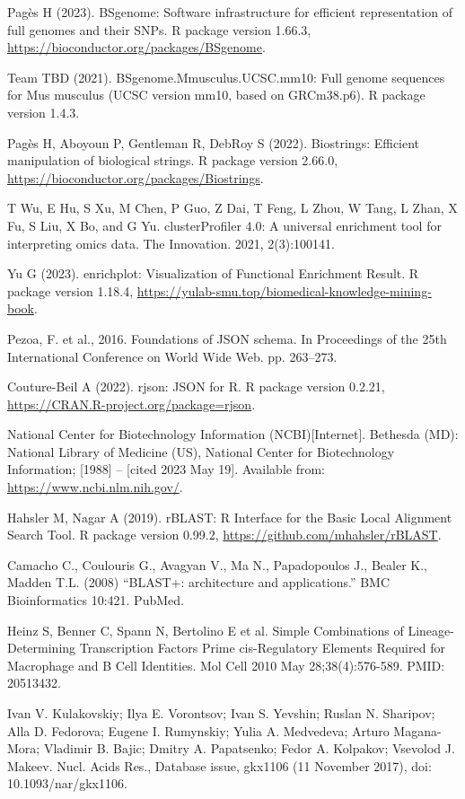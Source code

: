 \documentclass[12pt]{article}
\begin{document}
\begin{thebibliography}{99}
 Pagès H (2023). BSgenome: Software infrastructure for
efficient representation of full genomes and their SNPs. R package version
1.66.3, \newline
\url{https://bioconductor.org/packages/BSgenome}.

 Team TBD (2021). BSgenome.Mmusculus.UCSC.mm10: Full
genome sequences for Mus musculus (UCSC version mm10, based on GRCm38.p6). R
package version 1.4.3.

 Pagès H, Aboyoun P, Gentleman R, DebRoy S (2022).
Biostrings: Efficient manipulation of biological strings. R package version
2.66.0, \newline
\url{https://bioconductor.org/packages/Biostrings}.

 T Wu, E Hu, S Xu, M Chen, P Guo, Z Dai, T Feng,
L Zhou, W Tang, L Zhan, X Fu, S Liu, X Bo, and G Yu. clusterProfiler 4.0:
A universal enrichment tool for interpreting omics data. The Innovation. 2021,
2(3):100141.

 Yu G (2023). enrichplot: Visualization of Functional
Enrichment Result. R package version 1.18.4, \newline
\url{https://yulab-smu.top/biomedical-knowledge-mining-book}.

 Pezoa, F. et al., 2016. Foundations of JSON schema. In
Proceedings of the 25th International Conference on World Wide Web. pp. 263–273.

 Couture-Beil A (2022). rjson: JSON for R. R package version
0.2.21, \newline
\url{https://CRAN.R-project.org/package=rjson}.

 National Center for Biotechnology Information (NCBI)[Internet].
Bethesda (MD): National Library of Medicine (US), National Center for
Biotechnology Information; [1988] – [cited 2023 May 19]. Available from:
\url{https://www.ncbi.nlm.nih.gov/}.

 Hahsler M, Nagar A (2019). rBLAST: R Interface for the Basic
Local Alignment Search Tool. R package version 0.99.2, \newline
\url{https://github.com/mhahsler/rBLAST}.

 Camacho C., Coulouris G., Avagyan V., Ma N., Papadopoulos J.,
Bealer K., Madden T.L. (2008) “BLAST+: architecture and applications.”
BMC Bioinformatics 10:421. PubMed.

 Heinz S, Benner C, Spann N, Bertolino E et al. Simple
Combinations of Lineage-Determining Transcription Factors Prime cis-Regulatory
Elements Required for Macrophage and B Cell Identities. Mol Cell 2010 May
28;38(4):576-589. PMID: 20513432.

 Ivan V. Kulakovskiy; Ilya E. Vorontsov; Ivan S. Yevshin;
Ruslan N. Sharipov; Alla D. Fedorova; Eugene I. Rumynskiy; Yulia A. Medvedeva;
Arturo Magana-Mora; Vladimir B. Bajic; Dmitry A. Papatsenko; Fedor A. Kolpakov;
Vsevolod J. Makeev. Nucl. Acids Res., Database issue, gkx1106
(11 November 2017), doi: 10.1093/nar/gkx1106.

\end{thebibliography}
\newpage
\end{document}

